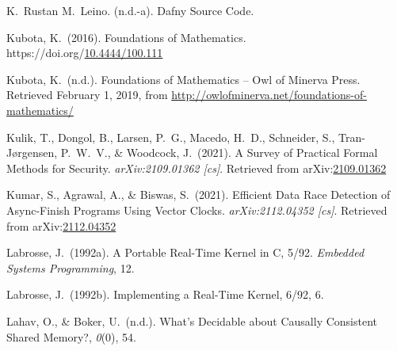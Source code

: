 \documentclass[12pt,twoside]{article}
\begin{document}
{\begin{thebibliography}{1079}
\mdbibitemlabel{}K.~Rustan M.~Leino. (n.d.-a). Dafny Source Code.%

\mdbibitemlabel{}Kubota, K.~(2016). Foundations of Mathematics. https://doi.org/\href{https://dx.doi.org/10.4444/100.111}{10.4444/100.111}%

\mdbibitemlabel{}Kubota, K.~(n.d.). Foundations of Mathematics – Owl of Minerva Press. Retrieved February 1, 2019, from \href{http://owlofminerva.net/foundations-of-mathematics/}{{\ttfamily http://\hspace{0pt}owlofminerva.\hspace{0pt}net/\hspace{0pt}foundations-\hspace{0pt}of-\hspace{0pt}mathematics/\hspace{0pt}}}%

\mdbibitemlabel{}Kulik, T., Dongol, B., Larsen, P.~G., Macedo, H.~D., Schneider, S., Tran-Jørgensen, P.~W.~V., \& Woodcock, J.~(2021). A Survey of Practical Formal Methods for Security. \emph{arXiv:2109.01362 {}[cs]}. Retrieved from arXiv:\href{http://arxiv.org/abs/2109.01362}{2109.01362}%

\mdbibitemlabel{}Kumar, S., Agrawal, A., \& Biswas, S.~(2021). Efficient Data Race Detection of Async-Finish Programs Using Vector Clocks. \emph{arXiv:2112.04352 {}[cs]}. Retrieved from arXiv:\href{http://arxiv.org/abs/2112.04352}{2112.04352}%

\mdbibitemlabel{}Labrosse, J.~(1992a). A Portable Real-Time Kernel in C, 5/92. \emph{Embedded Systems Programming}, 12.%

\mdbibitemlabel{}Labrosse, J.~(1992b). Implementing a Real-Time Kernel, 6/92, 6.%

\mdbibitemlabel{}Lahav, O., \& Boker, U.~(n.d.). What’s Decidable about Causally Consistent Shared Memory?, \emph{0}(0), 54.%


\end{thebibliography}}
\end{document}
